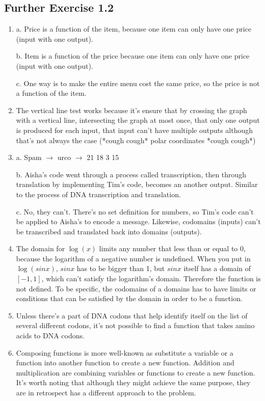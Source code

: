 \documentclass[12pt]{article}
\begin{document}
\subsection*{Further Exercise 1.2}
\begin{enumerate}
    \item a. Price is a function of the item, because one item can only have one price (input with one output).

    b. Item is a function of the price because one item can only have one price (input with one output).
    
    c. One way is to make the entire menu cost the same price, so the price is not a function of the item.

    \item The vertical line test works because it's ensure that by crossing the graph with a vertical line, intersecting the graph at most once, that only one output is produced for each input, that input can't have multiple outputs although that's not always the case (*cough cough* polar coordinates *cough cough*)
    
    \item a. Spam $\rightarrow$ urco $\rightarrow$ 21 18 3 15

    b. Aisha's code went through a process called transcription, then through translation by implementing Tim's code, becomes an another output. Similar to the process of DNA transcription and translation.
    
    c. No, they can't. There's no set definition for numbers, so Tim's code can't be applied to Aisha's to encode a message. Likewise, codomains (inputs) can't be transcribed and translated back into domains (outputs).

    \item The domain for $\log(x)$ limits any number that less than or equal to 0, because the logarithm of a negative number is undefined. When you put in $\log(sinx)$, $sinx$ has to be bigger than 1, but $sinx$ itself has a domain of $[-1, 1]$, which can't satisfy the logarithm's domain. Therefore the function is not defined. To be specific, the codomains of a domains has to have limits or conditions that can be satisfied by the domain in order to be a function.
    
    \item Unless there's a part of DNA codons that help identify itself on the list of several different codons, it's not possible to find a function that takes amino acids to DNA codons. 
    
    \item Composing functions is more well-known as substitute a variable or a function into another function to create a new function. Addition and multiplication are combining variables or functions to create a new function. It's worth noting that although they might achieve the same purpose, they are in retrospect has a different approach to the problem.
\end{enumerate}
\end{document}
